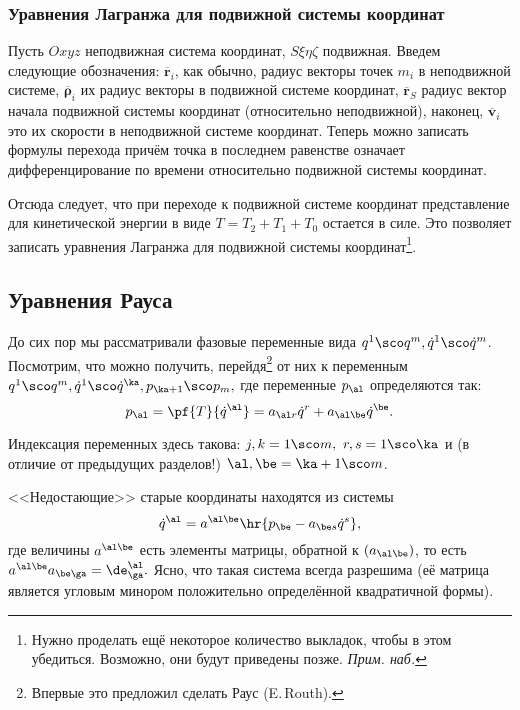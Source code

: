 \documentclass[a4paper,12pt]{article}
\newcommand{\vb}[1]{\mathbf{\overline{#1}}}
\newcommand{\vd}[1]{\dot{\mathbf{\overline{#1}}}}
\newcommand{\vpr}[2]{\hs{#1 \times #2}}
\newcommand{\eql}[2]{\begin{equation}\label{#2}#1\end{equation}}
\begin{document}
\subsubsection{Уравнения Лагранжа для подвижной системы координат}
\label{ref:moving-system}
Пусть $Oxyz$ неподвижная система координат, $S\xi\eta\zeta$
подвижная. Введем следующие обозначения: $\vb{r}_i$, как обычно, радиус векторы
точек $m_i$  в неподвижной системе,
$\vb{\rho}_i$ их радиус векторы в подвижной системе координат,
$\vb{r}_S$ радиус вектор начала подвижной системы координат
(относительно неподвижной), наконец, $\vb{v}_i$ это их скорости
в неподвижной системе координат. Теперь можно записать формулы перехода
\equ{\vb{r}_i=\vb{r}_S+\vb{\rho}_i(q,t),\
\vb{v}_i=\vb{v}_S+\frac{d\vb{\rho}_i}{dt}=
\vb{v}_S+\vpr{\vb{\om}}{\vb{\rho}_i}+\vd{\rho}_i,}
причём точка в последнем равенстве означает дифференцирование по
времени относительно подвижной системы координат.

Отсюда следует, что при
переходе к подвижной системе координат представление для
кинетической энергии в виде $T=T_2+T_1+T_0$ остается в силе.
Это позволяет записать уравнения Лагранжа для подвижной системы координат\footnote{Нужно проделать ещё некоторое количество выкладок,
чтобы в этом убедиться. Возможно, они будут приведены позже. \emph{Прим. наб.}}.


\subsection{Уравнения Рауса}

До сих пор мы рассматривали фазовые переменные вида $q^1\sco
q^m,\dot{q}^1\sco \dot{q}^m$. Посмотрим, что можно получить,
перейдя\footnote{Впервые это предложил сделать Раус (E.\,Routh).} от них к
переменным $q^1\sco q^m,\dot{q}^1\sco\dot{q}^{\ka},p_{\ka+1}\sco
p_m,$ где переменные $p_\al$ определяются так:
\eql{p_{\al}=\pf{T}{\dot{q}^{\al}}=a_{\al
r}\dot{q}^r+a_{\al\be}\dot{q}^{\be}.}{rauss_var}
\begin{note}
Индексация переменных здесь такова: $j,k=1\sco m,\ r,s=1\sco \ka$ и (в отличие от предыдущих разделов!)
$\al,\be=\ka+1\sco m$.
\end{note}
<<Недостающие>> старые координаты находятся из системы
\eql{\dot{q}^{\al}=a^{\al\be}\hr{p_{\be}-a_{\be
s}\dot{q}^s},}{var_trans_rauss} где величины $a^{\al\be}$ есть
элементы матрицы, обратной к $(a_{\al\be})$, то есть
$a^{\al\be}a_{\be\ga}=\de_{\ga}^{\al}.$ Ясно, что такая система
всегда разрешима (её матрица является угловым минором положительно определённой квадратичной формы).
\end{document}
